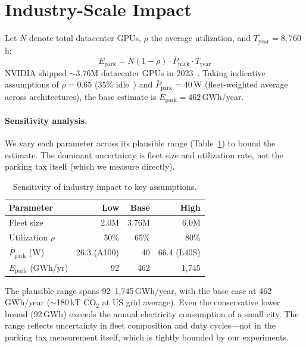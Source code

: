 \documentclass[sigconf,nonacm]{acmart}
\begin{document}
\section{Industry-Scale Impact}

Let $N$ denote total datacenter GPUs, $\rho$ the average utilization, and $T_{\text{year}} = 8{,}760$\,h:
\begin{equation}
    E_{\text{park}} = N(1 - \rho) \cdot \bar{P}_{\text{park}} \cdot T_{\text{year}}
    \label{eq:industry}
\end{equation}
NVIDIA shipped $\sim$3.76M datacenter GPUs in 2023~\cite{nvidia-shipments}. Taking indicative assumptions of $\rho = 0.65$ (35\% idle~\cite{flexera}) and $\bar{P}_{\text{park}} = 40$\,W (fleet-weighted average across architectures), the base estimate is $E_{\text{park}} = 462$\,GWh/year.

\paragraph{Sensitivity analysis.} We vary each parameter across its plausible range (Table~\ref{tab:sensitivity}) to bound the estimate. The dominant uncertainty is fleet size and utilization rate, not the parking tax itself (which we measure directly).

\begin{table}[t]
\caption{Sensitivity of industry impact to key assumptions.}
\label{tab:sensitivity}
\small
\begin{tabular}{lrrr}
\toprule
\textbf{Parameter} & \textbf{Low} & \textbf{Base} & \textbf{High} \\
\midrule
Fleet size & 2.0M & 3.76M & 6.0M \\
Utilization $\rho$ & 50\% & 65\% & 80\% \\
$\bar{P}_{\text{park}}$ (W) & 26.3 (A100) & 40 & 66.4 (L40S) \\
\midrule
$E_{\text{park}}$ (GWh/yr) & 92 & 462 & 1{,}745 \\
\bottomrule
\end{tabular}
\end{table}

The plausible range spans 92--1{,}745\,GWh/year, with the base case at 462\,GWh/year ($\sim$180\,kT CO$_2$ at US grid average). Even the conservative lower bound (92\,GWh) exceeds the annual electricity consumption of a small city. The range reflects uncertainty in fleet composition and duty cycles---not in the parking tax measurement itself, which is tightly bounded by our experiments.
\end{document}
